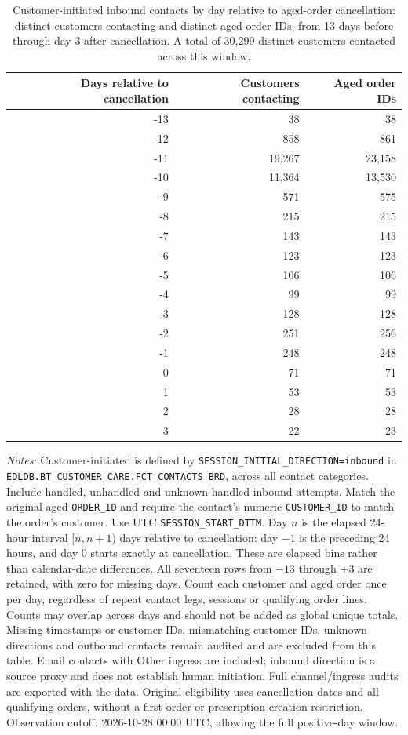 \begin{table}[!htbp]
\centering
\caption{Customer-initiated inbound contacts by day relative to aged-order cancellation: distinct customers contacting and distinct aged order IDs, from 13 days before through day 3 after cancellation. A total of 30,299 distinct customers contacted across this window.}
\label{tab:aged-customer-contacts-by-cancellation-day}
\begin{tabular}{@{}rrr@{}}
\toprule
Days relative to cancellation & Customers contacting & Aged order IDs \\
\midrule
-13 & 38 & 38 \\
-12 & 858 & 861 \\
-11 & 19,267 & 23,158 \\
-10 & 11,364 & 13,530 \\
-9 & 571 & 575 \\
-8 & 215 & 215 \\
-7 & 143 & 143 \\
-6 & 123 & 123 \\
-5 & 106 & 106 \\
-4 & 99 & 99 \\
-3 & 128 & 128 \\
-2 & 251 & 256 \\
-1 & 248 & 248 \\
0 & 71 & 71 \\
1 & 53 & 53 \\
2 & 28 & 28 \\
3 & 22 & 23 \\
\bottomrule
\end{tabular}

\begin{minipage}{\linewidth}
\footnotesize
\textit{Notes:} Customer-initiated is defined by
\texttt{SESSION\_INITIAL\_DIRECTION=inbound} in
\texttt{EDLDB.BT\_CUSTOMER\_CARE.FCT\_CONTACTS\_BRD}, across all contact
categories. Include handled, unhandled and unknown-handled inbound attempts. Match the original aged \texttt{ORDER\_ID} and require
the contact's numeric \texttt{CUSTOMER\_ID} to match the order's customer.
Use UTC \texttt{SESSION\_START\_DTTM}. Day $n$ is the elapsed 24-hour interval
$[n,n+1)$ days relative to cancellation: day $-1$ is the preceding 24 hours,
and day $0$ starts exactly at cancellation. These are elapsed bins rather
than calendar-date differences. All seventeen rows from $-13$ through $+3$
are retained, with zero for missing days. Count each customer and aged order
once per day, regardless of repeat contact legs, sessions or qualifying order
lines. Counts may overlap across days and should not be added as global unique
totals. Missing timestamps or customer IDs, mismatching customer IDs, unknown
directions and outbound contacts remain audited and are excluded from this
table. Email contacts with Other ingress are included; inbound direction is
a source proxy and does not establish human initiation. Full channel/ingress
audits are exported with the data. Original eligibility uses cancellation
dates and all qualifying orders, without a first-order or prescription-creation
restriction. Observation cutoff: 2026-10-28 00:00 UTC, allowing the full positive-day window.
\end{minipage}
\end{table}

